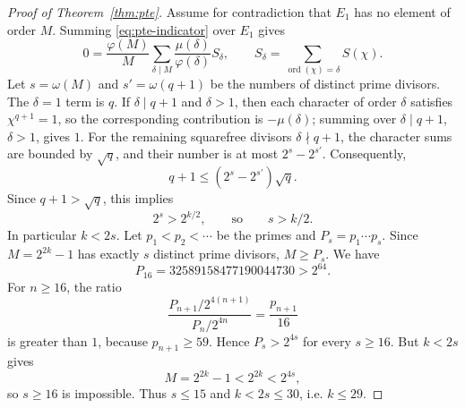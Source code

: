\begin{proof}[Proof of Theorem~\ref{thm:pte}]
Assume for contradiction that $E_1$ has no element of order $M$. Summing
\eqref{eq:pte-indicator} over $E_1$ gives
\[
0=\frac{\varphi(M)}M
\sum_{\delta\mid M}\frac{\mu(\delta)}{\varphi(\delta)}S_\delta,
\qquad
S_\delta=\sum_{\operatorname{ord}(\chi)=\delta}S(\chi).
\]
Let $s=\omega(M)$ and $s'=\omega(q+1)$ be the numbers of distinct prime
divisors. The $\delta=1$ term is $q$. If $\delta\mid q+1$ and $\delta>1$,
then each character of order $\delta$ satisfies $\chi^{q+1}=1$, so the
corresponding contribution is $-\mu(\delta)$; summing over
$\delta\mid q+1$, $\delta>1$, gives $1$. For the remaining squarefree
divisors $\delta\nmid q+1$, the character sums are bounded by $\sqrt q$,
and their number is at most $2^s-2^{s'}$. Consequently,
\[
q+1\le(2^s-2^{s'})\sqrt q. \tag{A.2}
\]
Since $q+1>\sqrt q$, this implies
\[
2^s>2^{k/2}, \qquad\text{so}\qquad s>k/2.
\]
In particular $k<2s$. Let $p_1<p_2<\cdots$ be the primes and
$P_s=p_1\cdots p_s$. Since $M=2^{2k}-1$ has exactly $s$ distinct prime
divisors, $M\ge P_s$. We have
\[
P_{16}=32589158477190044730>2^{64}.
\]
For $n\ge16$, the ratio
\[
\frac{P_{n+1}/2^{4(n+1)}}{P_n/2^{4n}}
=\frac{p_{n+1}}{16}
\]
is greater than $1$, because $p_{n+1}\ge59$. Hence $P_s>2^{4s}$ for
every $s\ge16$. But $k<2s$ gives
\[
M=2^{2k}-1<2^{2k}<2^{4s},
\]
so $s\ge16$ is impossible. Thus $s\le15$ and $k<2s\le30$, i.e.
$k\le29$.


\end{proof}
